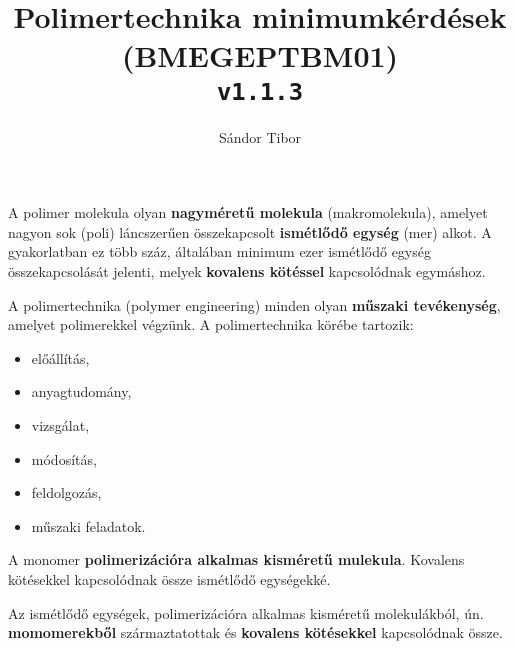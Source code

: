 \documentclass[12pt,a4paper]{article}       %
\title{Polimertechnika minimumkérdések \\ \large(BMEGEPTBM01) \\ \texttt{v1.1.3}}
\author{Sándor Tibor}
\begin{document}

\maketitle
\thispagestyle{fancy}

\begin{tcbitemize}[
    enhanced, raster columns=1, raster row skip=1em, raster equal height=rows,
    colback=red!20!yellow!5!white, colframe=yellow!25!black, breakable,
    enhanced jigsaw
  ]

  \tcbitem[title={\# \thetcbrasternum –
        Mi a polimer?
      }]
  A polimer molekula olyan \textbf{nagyméretű molekula} (makromolekula),
  amelyet nagyon sok (poli) láncszerűen összekapcsolt \textbf{ismétlődő egység}
  (mer) alkot. A gyakorlatban ez több száz, általában minimum ezer ismétlődő
  egység összekapcsolását jelenti, melyek \textbf{kovalens kötéssel}
  kapcsolódnak egymáshoz.



  \tcbitem[title={\# \thetcbrasternum –
        Mi a polimertechnika?
      }]
  A polimertechnika (polymer engineering) minden olyan \textbf{műszaki
    tevékenység}, amelyet polimerekkel végzünk. A polimertechnika körébe
  tartozik:
  \begin{multicols}{3}
    \begin{itemize}
      \item előállítás,
      \item anyagtudomány,
      \item vizsgálat,
      \item módosítás,
      \item feldolgozás,
      \item műszaki feladatok.
    \end{itemize}
  \end{multicols}



  \tcbitem[title={\# \thetcbrasternum{} –
        Mi a monomer?
      }]
  A monomer \textbf{polimerizációra alkalmas kisméretű mulekula}. Kovalens
  kötésekkel kapcsolódnak össze ismétlődő egységekké.



  \tcbitem[title={\# \thetcbrasternum{} –
        Mit jelent az ismétlődő egység?
      }]
  Az ismétlődő egységek, polimerizációra alkalmas kisméretű molekulákból, ún.
  \textbf{momomerekből} származtatottak és \textbf{kovalens kötésekkel}
  kapcsolódnak össze.




\end{tcbitemize}
\end{document}

